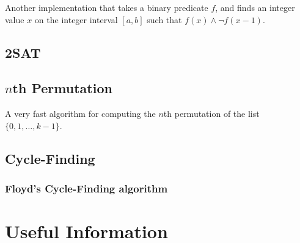 \documentclass[10pt,a4paper,titlepage]{article}
\begin{document}
Another implementation that takes a binary predicate $f$, and finds an integer value $x$ on the integer interval $[a,b]$ such that $f(x) \land \lnot f(x - 1)$.


\subsection{2SAT}


\subsection{$n$th Permutation}
A very fast algorithm for computing the $n$th permutation of the list $\{0,1,\ldots,k-1\}$.


\subsection{Cycle-Finding}
\subsubsection{Floyd's Cycle-Finding algorithm}


\section{Useful Information}
\end{document}
